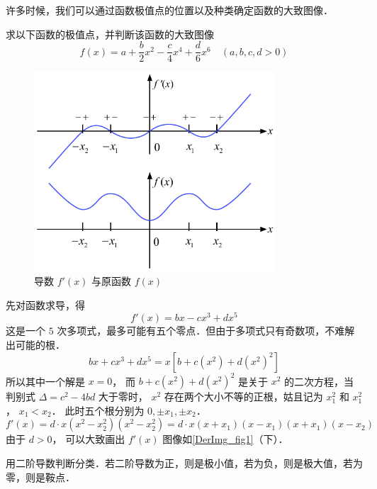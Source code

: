 
许多时候，我们可以通过函数极值点的位置以及种类确定函数的大致图像．

\begin{example}{}
求以下函数的极值点，并判断该函数的大致图像
\begin{equation}
f(x) = a + \frac{b}{2} x^2 - \frac{c}{4} x^4 + \frac{d}{6} x^6 \quad (a,b,c,d >0)
\end{equation}

\begin{figure}[ht]
\centering
\includegraphics[width=9cm]{./figures/DerImg1.pdf}
\caption{导数 $f'(x)$ 与原函数 $f(x)$}\label{DerImg_fig1}
\end{figure}

先对函数求导，得
\begin{equation}
f'(x) = bx - c x^3 + d x^5
\end{equation}
这是一个 $5$ 次多项式，最多可能有五个零点．但由于多项式只有奇数项，不难解出可能的根．
 \begin{equation}
bx + c x^3 + d x^5 = x[b + c(x^2) + d(x^2)^2 ]
\end{equation}
所以其中一个解是 $x = 0$， 而 $b + c(x^2) + d (x^2)^2$ 是关于 $x^2$ 的二次方程，当判别式 $\Delta  = c^2 - 4bd$ 大于零时， $x^2$ 存在两个大小不等的正根，姑且记为 $x_1^2$ 和 $x_1^2$， $x_1 < x_2$． 
此时五个根分别为 $0, \pm x_1, \pm x_2$． 
\begin{equation}
f'(x) = d \cdot x (x^2 - x_2^2) (x^2 - x_2^2) = d \cdot x (x + x_1)(x - x_1)(x + x_1)(x - x_2)
\end{equation} 
由于 $d > 0$， 可以大致画出 $f'(x)$ 图像如\autoref{DerImg_fig1}（下）．

用二阶导数判断分类．若二阶导数为正，则是极小值，若为负，则是极大值，若为零，则是鞍点．
\end{example}
